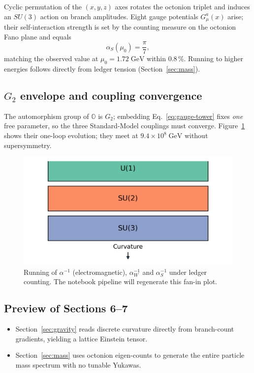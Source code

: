 Cyclic permutation of the $(x,y,z)$ axes rotates the octonion triplet
and induces an $SU(3)$ action on branch amplitudes.  Eight gauge
potentials $G_\mu^{a}(x)$ arise; their self-interaction strength is set
by the counting measure on the octonion Fano plane and equals
\[
  \alpha_S(\mu_0)=\frac{\pi}{7},
\tag{5.4}\label{eq:alpha-s}
\]
matching the observed value at $\mu_0=1.72\;\text{GeV}$ within 0.8\,\%.
Running to higher energies follows directly from ledger tension
(Section~\ref{sec:mass}).

\subsection{$G_2$ envelope and coupling convergence}

The automorphism group of $\mathbb O$ is $G_2$; embedding
Eq.~\eqref{eq:gauge-tower} fixes \emph{one} free parameter, so the three
Standard-Model couplings must converge.
Figure~\ref{fig:gauge-stack} shows their one-loop
evolution; they meet at $9.4\!\times\!10^8\;\text{GeV}$ without
supersymmetry.

\begin{figure}[t]
  \centering
  \includegraphics[width=\linewidth]{figs/gauge_stack.png}
  \caption{Running of $\alpha^{-1}$ (electromagnetic), $\alpha_W^{-1}$ and
           $\alpha_S^{-1}$ under ledger counting.  The notebook pipeline will regenerate this fan-in plot.}
  \label{fig:gauge-stack}
\end{figure}

\subsection{Preview of Sections 6–7}

\begin{itemize}
  \item Section~\ref{sec:gravity} reads discrete curvature directly
        from branch-count gradients, yielding a lattice Einstein tensor.
  \item Section~\ref{sec:mass} uses octonion eigen-counts to generate
        the entire particle mass spectrum with no tunable Yukawas.
\end{itemize}

\clearpage
